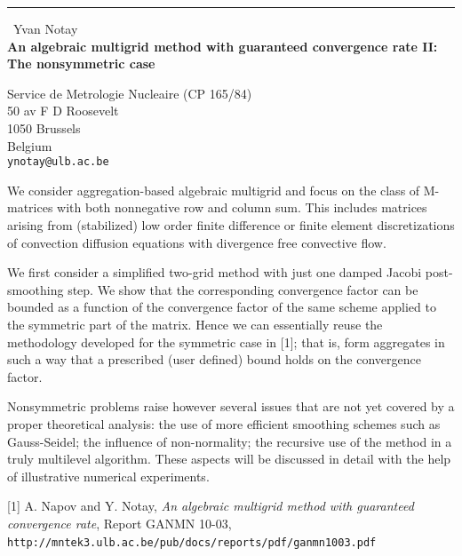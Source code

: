 \documentclass{report}
\begin{document}
\begin{center}
\rule{6in}{1pt} \
{\large Yvan Notay \\
{\bf An algebraic multigrid method with guaranteed convergence rate II: The nonsymmetric case}}

Service de Metrologie Nucleaire (CP 165/84) \\ 50 av F D Roosevelt \\ 1050 Brussels \\ Belgium
\\
{\tt ynotay@ulb.ac.be}\end{center}

We consider aggregation-based algebraic multigrid
and focus on the class of
M-matrices with both nonnegative row and column sum. This includes matrices
arising from (stabilized) low order finite difference or finite element
discretizations of convection diffusion equations with divergence free
convective flow.

We first consider a simplified two-grid method with just one damped Jacobi
post-smoothing step. We show that the corresponding convergence factor
can be bounded as a function of the convergence factor of the same scheme
applied to the symmetric part of the matrix.
Hence we can essentially reuse the methodology developed for the symmetric
case in
[1]; that is, form aggregates
in such a way that a prescribed (user defined) bound holds on
the convergence factor.

Nonsymmetric problems raise however several issues that are not yet
covered by a proper
theoretical analysis: the use of more efficient smoothing schemes such as Gauss-Seidel;
the influence of non-normality;
the recursive use of the method in a truly multilevel algorithm.
These aspects will be discussed in detail with the help of illustrative
numerical experiments.


[1] A. Napov and Y. Notay, {\em An algebraic multigrid method with
guaranteed convergence rate},
Report GANMN 10-03, \\
\verb+http://mntek3.ulb.ac.be/pub/docs/reports/pdf/ganmn1003.pdf+\,
\end{document}
